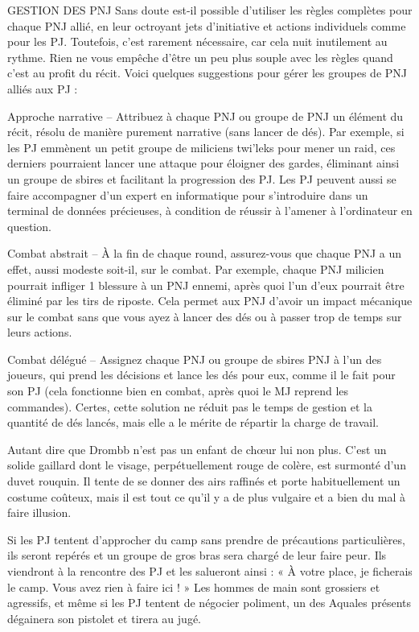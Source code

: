 \documentclass[a4paper,10pt,twoside,twocolumn,openany]{book}
\begin{document}
\begin{commentbox}{GESTION DES PNJ}
  Sans doute est-il possible d’utiliser les règles complètes pour chaque PNJ allié, en leur octroyant jets
d’initiative et actions individuels comme pour les
PJ. Toutefois, c’est rarement nécessaire, car cela
nuit inutilement au rythme. Rien ne vous empêche
d’être un peu plus souple avec les règles quand
c’est au profit du récit. Voici quelques suggestions
pour gérer les groupes de PNJ alliés aux PJ :

Approche narrative – Attribuez à chaque
PNJ ou groupe de PNJ un élément du récit, résolu de manière purement narrative (sans lancer de dés). Par exemple, si les PJ emmènent
un petit groupe de miliciens twi’leks pour mener un raid, ces derniers pourraient lancer une
attaque pour éloigner des gardes, éliminant
ainsi un groupe de sbires et facilitant la progression des PJ. Les PJ peuvent aussi se faire
accompagner d’un expert en informatique
pour s’introduire dans un terminal de données
précieuses, à condition de réussir à l’amener à
l’ordinateur en question.

Combat abstrait – À la fin de chaque round,
assurez-vous que chaque PNJ a un effet, aussi
modeste soit-il, sur le combat. Par exemple,
chaque PNJ milicien pourrait infliger 1 blessure à un PNJ ennemi, après quoi l’un d’eux
pourrait être éliminé par les tirs de riposte.
Cela permet aux PNJ d’avoir un impact mécanique sur le combat sans que vous ayez à
lancer des dés ou à passer trop de temps sur
leurs actions.

Combat délégué – Assignez chaque PNJ ou
groupe de sbires PNJ à l’un des joueurs, qui
prend les décisions et lance les dés pour eux,
comme il le fait pour son PJ (cela fonctionne
bien en combat, après quoi le MJ reprend
les commandes). Certes, cette solution ne réduit pas le temps de gestion et la quantité de
dés lancés, mais elle a le mérite de répartir la
charge de travail.

\end{commentbox}

Autant dire que Drombb n’est pas un enfant de chœur lui non plus. C’est un solide gaillard dont le visage, perpétuellement rouge de colère, est surmonté d’un duvet rouquin. Il tente de se donner des airs raffinés et porte habituellement un costume coûteux, mais il est tout ce qu’il y a de plus vulgaire et a bien du mal à faire illusion.

Si les PJ tentent d’approcher du camp sans prendre de précautions particulières, ils seront repérés et un groupe de gros bras sera chargé de leur faire peur. Ils viendront à la rencontre des PJ et les salueront ainsi : « À votre place, je ficherais le camp. Vous avez rien à faire ici ! » Les hommes de main sont grossiers et agressifs, et même si les PJ tentent de négocier poliment, un des Aquales présents dégainera son pistolet et tirera au jugé.
\end{document}
